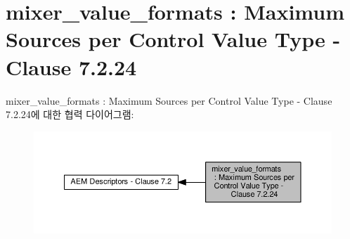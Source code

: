 \hypertarget{group__mixer__value__formats}{}\section{mixer\+\_\+value\+\_\+formats \+: Maximum Sources per Control Value Type -\/ Clause 7.2.24}
\label{group__mixer__value__formats}
mixer\+\_\+value\+\_\+formats \+: Maximum Sources per Control Value Type -\/ Clause 7.2.24에 대한 협력 다이어그램\+:
\nopagebreak
\begin{figure}[H]
\begin{center}
\leavevmode
\includegraphics[width=350pt]{group__mixer__value__formats}
\end{center}
\end{figure}
